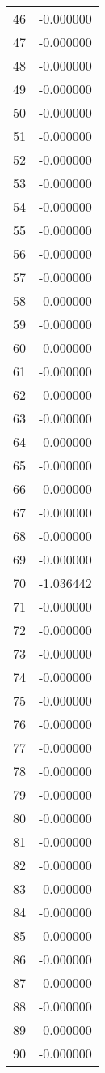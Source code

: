 \documentclass[12pt]{article}
\begin{document}
\begin{longtable}{@{}cc@{}}
46 & -0.000000 \\
47 & -0.000000 \\
48 & -0.000000 \\
49 & -0.000000 \\
50 & -0.000000 \\
51 & -0.000000 \\
52 & -0.000000 \\
53 & -0.000000 \\
54 & -0.000000 \\
55 & -0.000000 \\
56 & -0.000000 \\
57 & -0.000000 \\
58 & -0.000000 \\
59 & -0.000000 \\
60 & -0.000000 \\
61 & -0.000000 \\
62 & -0.000000 \\
63 & -0.000000 \\
64 & -0.000000 \\
65 & -0.000000 \\
66 & -0.000000 \\
67 & -0.000000 \\
68 & -0.000000 \\
69 & -0.000000 \\
70 & -1.036442 \\
71 & -0.000000 \\
72 & -0.000000 \\
73 & -0.000000 \\
74 & -0.000000 \\
75 & -0.000000 \\
76 & -0.000000 \\
77 & -0.000000 \\
78 & -0.000000 \\
79 & -0.000000 \\
80 & -0.000000 \\
81 & -0.000000 \\
82 & -0.000000 \\
83 & -0.000000 \\
84 & -0.000000 \\
85 & -0.000000 \\
86 & -0.000000 \\
87 & -0.000000 \\
88 & -0.000000 \\
89 & -0.000000 \\
90 & -0.000000 \\

\end{longtable}
\end{document}

